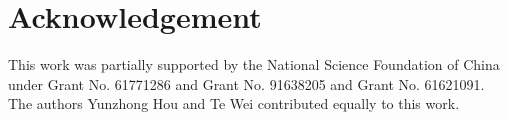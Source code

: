 \documentclass[conference]{IEEEtran}
\begin{document}



\section*{Acknowledgement}

This work was partially supported by the National Science Foundation of China under Grant No. 61771286 and Grant No. 91638205 and Grant No. 61621091. The authors Yunzhong Hou and Te Wei contributed equally to this work.
\end{document}
